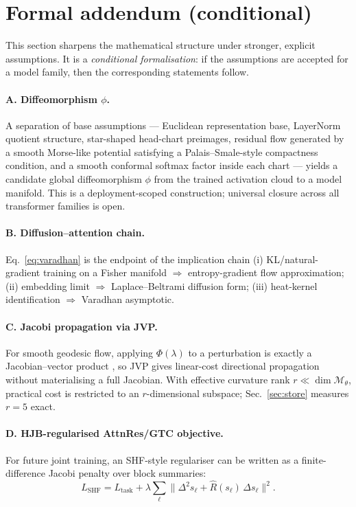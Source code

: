 \documentclass[11pt]{article}
\begin{document}
\section{Formal addendum (conditional)}
\label{sec:formal}

This section sharpens the mathematical structure under stronger, explicit
assumptions. It is a \emph{conditional formalisation}: if the assumptions are
accepted for a model family, then the corresponding statements follow.

\paragraph{A. Diffeomorphism $\phi$.} A separation of base assumptions ---
Euclidean representation base, LayerNorm quotient structure, star-shaped
head-chart preimages, residual flow generated by a smooth Morse-like potential
satisfying a Palais--Smale-style compactness condition, and a smooth conformal
softmax factor inside each chart --- yields a candidate global diffeomorphism
$\phi$ from the trained activation cloud to a model manifold. This is a
deployment-scoped construction; universal closure across all transformer
families is open.

\paragraph{B. Diffusion--attention chain.} Eq.~\eqref{eq:varadhan} is the
endpoint of the implication chain (i) KL/natural-gradient training on a Fisher
manifold $\Rightarrow$ entropy-gradient flow approximation; (ii) embedding
limit $\Rightarrow$ Laplace--Beltrami diffusion form; (iii) heat-kernel
identification $\Rightarrow$ Varadhan asymptotic.

\paragraph{C. Jacobi propagation via JVP.} For smooth geodesic flow, applying
$\Phi(\lambda)$ to a perturbation is exactly a Jacobian--vector product
\cite{pearlmutter1994fast}, so JVP gives linear-cost directional propagation
without materialising a full Jacobian. With effective curvature rank $r\ll\dim
\mathcal{M}_\theta$, practical cost is restricted to an $r$-dimensional
subspace; Sec.~\ref{sec:store} measures $r=5$ exact.

\paragraph{D. HJB-regularised AttnRes/GTC objective.} For future joint
training, an SHF-style regulariser can be written as a finite-difference
Jacobi penalty over block summaries:
\begin{equation}
L_{\mathrm{SHF}} = L_{\mathrm{task}} + \lambda\sum_\ell
\bigl\|\Delta^2 s_\ell + \hat R(s_\ell)\,\Delta s_\ell\bigr\|^2.
\end{equation}
\end{document}
